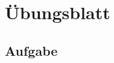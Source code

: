 \documentclass[a4paper, 11pt]{article}
\begin{document}
\setcounter{section}{0}
\section{\"Ubungsblatt}
\subsection{Aufgabe}

%

%
\end{document}
